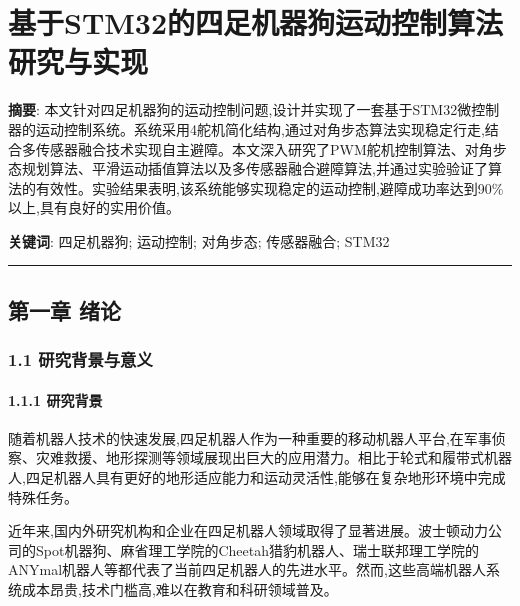 \documentclass[
]{article}
\author{}
\date{}
\begin{document}
\hypertarget{ux57faux4e8estm32ux7684ux56dbux8db3ux673aux5668ux72d7ux8fd0ux52a8ux63a7ux5236ux7b97ux6cd5ux7814ux7a76ux4e0eux5b9eux73b0}{%
\section{基于STM32的四足机器狗运动控制算法研究与实现}\label{ux57faux4e8estm32ux7684ux56dbux8db3ux673aux5668ux72d7ux8fd0ux52a8ux63a7ux5236ux7b97ux6cd5ux7814ux7a76ux4e0eux5b9eux73b0}}

\textbf{摘要}:
本文针对四足机器狗的运动控制问题,设计并实现了一套基于STM32微控制器的运动控制系统。系统采用4舵机简化结构,通过对角步态算法实现稳定行走,结合多传感器融合技术实现自主避障。本文深入研究了PWM舵机控制算法、对角步态规划算法、平滑运动插值算法以及多传感器融合避障算法,并通过实验验证了算法的有效性。实验结果表明,该系统能够实现稳定的运动控制,避障成功率达到90\%以上,具有良好的实用价值。

\textbf{关键词}: 四足机器狗; 运动控制; 对角步态; 传感器融合; STM32

\begin{center}\rule{0.5\linewidth}{0.5pt}\end{center}

\hypertarget{ux7b2cux4e00ux7ae0-ux7eeaux8bba}{%
\subsection{第一章 绪论}\label{ux7b2cux4e00ux7ae0-ux7eeaux8bba}}

\hypertarget{ux7814ux7a76ux80ccux666fux4e0eux610fux4e49}{%
\subsubsection{1.1
研究背景与意义}\label{ux7814ux7a76ux80ccux666fux4e0eux610fux4e49}}

\hypertarget{ux7814ux7a76ux80ccux666f}{%
\paragraph{1.1.1 研究背景}\label{ux7814ux7a76ux80ccux666f}}

随着机器人技术的快速发展,四足机器人作为一种重要的移动机器人平台,在军事侦察、灾难救援、地形探测等领域展现出巨大的应用潜力。相比于轮式和履带式机器人,四足机器人具有更好的地形适应能力和运动灵活性,能够在复杂地形环境中完成特殊任务。

近年来,国内外研究机构和企业在四足机器人领域取得了显著进展。波士顿动力公司的Spot机器狗、麻省理工学院的Cheetah猎豹机器人、瑞士联邦理工学院的ANYmal机器人等都代表了当前四足机器人的先进水平。然而,这些高端机器人系统成本昂贵,技术门槛高,难以在教育和科研领域普及。
\end{document}

